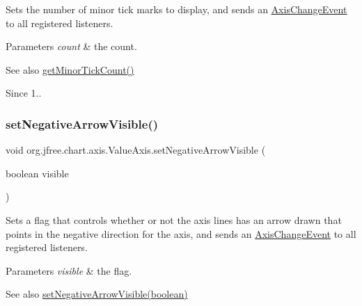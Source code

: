 Sets the number of minor tick marks to display, and sends an \mbox{\hyperlink{}{Axis\+Change\+Event}} to all registered listeners.


\begin{DoxyParams}{Parameters}
{\em count} & the count.\\
\hline
\end{DoxyParams}
\begin{DoxySeeAlso}{See also}
\mbox{\hyperlink{classorg_1_1jfree_1_1chart_1_1axis_1_1_value_axis_a8cb8bb0f108e528454263e94bd1bd35c}{get\+Minor\+Tick\+Count()}}
\end{DoxySeeAlso}
\begin{DoxySince}{Since}
1.. 
\end{DoxySince}
\mbox{\label{classorg_1_1jfree_1_1chart_1_1axis_1_1_value_axis_a893d80e7d1feb0c3e083749a11bebc5f}} 
\subsubsection{\texorpdfstring{set\+Negative\+Arrow\+Visible()}{setNegativeArrowVisible()}}
{\footnotesize\ttfamily void org.\+jfree.\+chart.\+axis.\+Value\+Axis.\+set\+Negative\+Arrow\+Visible (\begin{DoxyParamCaption}\item[{boolean}]{visible }\end{DoxyParamCaption})}

Sets a flag that controls whether or not the axis lines has an arrow drawn that points in the negative direction for the axis, and sends an \mbox{\hyperlink{}{Axis\+Change\+Event}} to all registered listeners.


\begin{DoxyParams}{Parameters}
{\em visible} & the flag.\\
\hline
\end{DoxyParams}
\begin{DoxySeeAlso}{See also}
\mbox{\hyperlink{classorg_1_1jfree_1_1chart_1_1axis_1_1_value_axis_a893d80e7d1feb0c3e083749a11bebc5f}{set\+Negative\+Arrow\+Visible(boolean)}} 
\end{DoxySeeAlso}
\mbox{\label{classorg_1_1jfree_1_1chart_1_1axis_1_1_value_axis_ace6e9ae3bfb65950ec5ca771f432630f}} 

